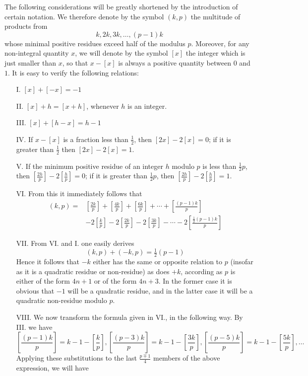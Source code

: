 \documentclass{book}
\theoremstyle{plain}
\theoremstyle{remark}
\begin{document}
The following considerations will be greatly shortened by the introduction of certain notation.  We therefore denote by the symbol $(k,p)$ the multitude of products from
\[ k, 2k, 3k, \dots, (p-1)k \]
whose minimal positive residues exceed half of the modulus $p$.    Moreover, for any non-integral quantity $x$, we will denote by the symbol $[x]$ the integer which is just smaller than $x$, so that $x - [x]$ is always a positive quantity between $0$ and $1$.  It is easy to verify the following relations:
\begin{enumerate}
\item[I.] $[x] + [-x] = -1$ 
\item[II.] $[x] + h = [x+h]$, whenever $h$ is an integer.
\item[III.] $[x] + [h-x] = h-1$
\item[IV.] If $x-[x]$ is a fraction less than $\frac{1}{2}$, then $[2x]-2[x]=0$; if it is greater than $\frac{1}{2}$ then $[2x]-2[x]=1$.
\item[V.] If the minimum positive residue of an integer $h$ modulo $p$ is less than $\tfrac{1}{2}p$, then $\left[\frac{2h}{p}\right]-2\left[\frac{h}{p}\right] = 0$;  if it is greater than $\tfrac{1}{2} p$, then $\left[\frac{2h}{p}\right]-2\left[\frac{h}{p}\right] = 1$.
\item[VI.] From this it immediately follows that
\begin{align*} (k,p) = & \left[ \frac{2k}{p} \right] + \left[ \frac{4k}{p} \right] + \left[ \frac{6k}{p} \right] + \cdots + \left[ \frac{(p-1)k}{p} \right] \\
&- 2 \left[ \frac{k}{p} \right] - 2 \left[ \frac{2k}{p} \right] -2  \left[ \frac{3k}{p} \right]-  \cdots -  2 \left[ \frac{\frac{1}{2} (p-1)k}{p} \right] \end{align*}
\item[VII.] From VI. and I. one easily derives
\[ (k,p) + (-k,p) = \tfrac{1}{2} (p-1) \]
Hence it follows that  $-k$ either has the same or opposite relation to $p$ (insofar as it is a quadratic residue or non-residue) as does $+k$, according as $p$ is either of the form $ 4n+1$ or of the form $4n+3$.  In the former case it is obvious that $-1$ will be a quadratic residue, and in the latter case it will be a quadratic non-residue modulo $p$. 
\item[VIII.] We now transform the formula given in VI., in the following way.   By III. we have
\[ \left[ \frac{(p-1)k}{p}\right] = k-1-\left[\frac{k}{p}\right] , \left[ \frac{(p-3)k}{p}\right] = k-1-\left[\frac{3k}{p}\right] , \left[ \frac{(p-5)k}{p}\right] = k-1-\left[\frac{5k}{p}\right] , \dots \]
 Applying these substitutions to the last $\frac{p \mp 1}{4}$ members of the above expression, we will have
 

\end{enumerate}
\end{document}
